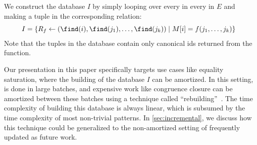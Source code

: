 We construct the database $I$
 by simply looping over every \enode in every \eclass in $E$
 and making
 a tuple in the corresponding relation:
\[
  I =
  \left\{
    R_f \gets (\find(i), \find(j_1), \ldots, \find(j_k))
    \mid
    M[i] = f(j_1, \ldots, j_k)
  \right\}
\]
Note that the tuples in the database contain only canonical \eclass
 ids returned from the \find{} function.



Our presentation in this paper specifically targets
 \ematching use cases like equality saturation,
 where the building of the database $I$ can be amortized.
In this setting, \ematching is done in large batches,
 and expensive work like congruence closure can be
 amortized between these batches using a technique called ``rebuilding''~\cite{egg}.
The time complexity of building this database is always linear,
 which is subsumed by the time complexity
 of most non-trivial \ematching patterns.
In \autoref{sec:incremental},
 we discuss how this technique could be
 generalized to the non-amortized setting of
 frequently updated \egraph as future work.


